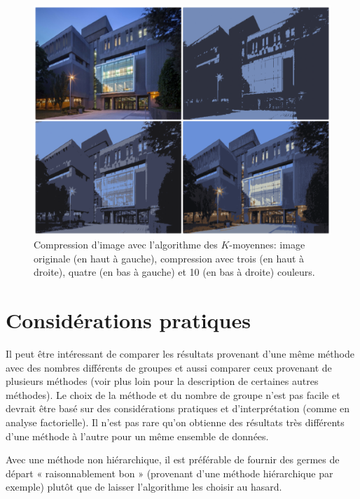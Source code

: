 \documentclass[
  11pt,
  letterpaper,
]{book}
\theoremstyle{definition}
\theoremstyle{definition}
\theoremstyle{definition}
\theoremstyle{definition}
\theoremstyle{remark}
\begin{document}
\begin{figure}

{\centering \includegraphics[width=0.8\linewidth]{figures/kmoyennes_decelles} 

}

\caption{Compression d'image avec l'algorithme des $K$-moyennes: image originale (en haut à gauche), compression avec trois (en haut à droite), quatre (en bas à gauche) et 10 (en bas à droite) couleurs.}\label{fig:decelles}
\end{figure}

\hypertarget{considuxe9rations-pratiques}{%
\section{Considérations pratiques}\label{considuxe9rations-pratiques}}

Il peut être intéressant de comparer les résultats provenant d'une même méthode avec des nombres différents de groupes et aussi comparer ceux provenant de plusieurs méthodes (voir plus loin pour la description de certaines autres méthodes). Le choix de la méthode et du nombre de groupe n'est pas facile et devrait être basé sur des considérations pratiques et d'interprétation (comme en analyse factorielle). Il n'est pas rare qu'on obtienne des résultats très différents d'une méthode à l'autre pour un même ensemble de données.

Avec une méthode non hiérarchique, il est préférable de fournir des germes de départ « raisonnablement bon » (provenant d'une méthode hiérarchique par exemple) plutôt que de laisser l'algorithme les choisir au hasard.
\end{document}
